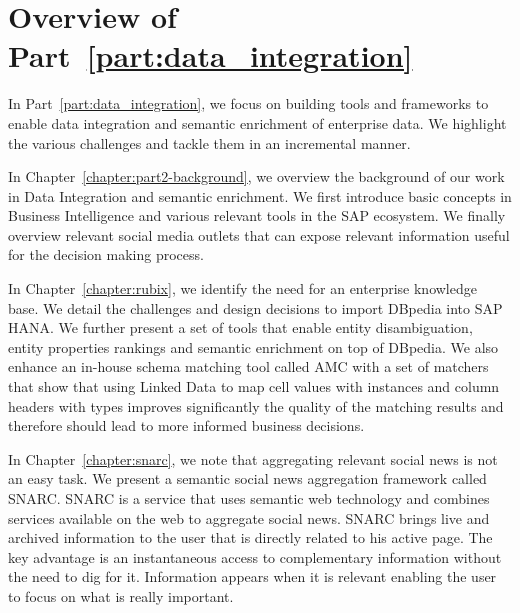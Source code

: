 \chapter*{Overview of Part~\ref{part:data_integration}}

In Part~\ref{part:data_integration}, we focus on building tools and frameworks to enable data integration and semantic enrichment of enterprise data. We highlight the various challenges and tackle them in an incremental manner.

In Chapter~\ref{chapter:part2-background}, we overview the background of our work in Data Integration and semantic enrichment. We first introduce basic concepts in Business Intelligence and various relevant tools in the SAP ecosystem. We finally overview relevant social media outlets that can expose relevant information useful for the decision making process.

In Chapter~\ref{chapter:rubix}, we identify the need for an enterprise knowledge base. We detail the challenges and design decisions to import DBpedia into SAP HANA. We further present a set of tools that enable entity disambiguation, entity properties rankings and semantic enrichment on top of DBpedia. We also enhance an in-house schema matching tool called AMC with a set of matchers that show that using Linked Data to map cell values with instances and column headers with types improves significantly the quality of the matching results and therefore should lead to more informed business decisions.

In Chapter~\ref{chapter:snarc}, we note that aggregating relevant social news is not an easy task. We present a semantic social news aggregation framework called SNARC. SNARC is a service that uses semantic web technology and combines services available on the web to aggregate social news. SNARC brings live and archived information to the user that is directly related to his active page. The key advantage is an instantaneous access to complementary information without the need to dig for it. Information appears when it is relevant enabling the user to focus on what is really important.